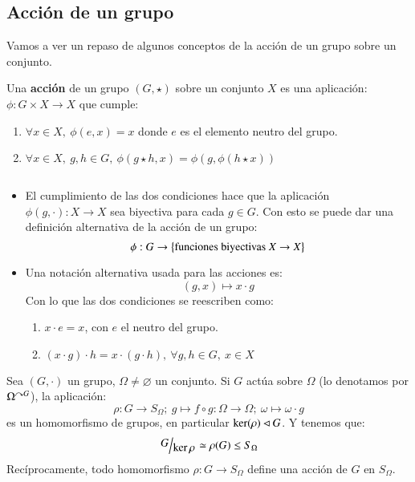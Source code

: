 \subsection{Acción de un grupo}

Vamos a ver un repaso de algunos conceptos de la acción de un grupo sobre un conjunto.

\begin{dfn}
    Una \textbf{acción} de un grupo $(G, \star)$ sobre un conjunto $X$ es una aplicación: $\phi: G \times X \to X$ que cumple:
    \begin{enumerate}
        \item $ \forall x \in X,\ \phi(e, x) = x$ donde $e$ es el elemento neutro del grupo.
        \item $ \forall x \in X,\ g, h \in G,\ \phi(g \star h, x) = \phi(g, \phi(h \star x))$
    \end{enumerate}
\end{dfn}
\begin{obs}$ $
    \begin{itemize}
        \item El cumplimiento de las dos condiciones hace que la aplicación $\phi(g, \cdot): X \to X$ sea biyectiva para cada $g \in G$. Con esto se puede dar una definición alternativa de la acción de un grupo:
        $$
            \phi: G \to \left\{\text{funciones biyectivas } X \to X\right\}
        $$
        \item Una notación alternativa usada para las acciones es:
        $$
            (g, x) \mapsto x \cdot g
        $$
        Con lo que las dos condiciones se reescriben como:
        \begin{enumerate}
            \item $x \cdot e = x$, con $e$ el neutro del grupo.
            \item $(x \cdot g) \cdot h = x \cdot (g \cdot h),\ \forall g,h \in G,\ x \in X$
        \end{enumerate}
    \end{itemize}
\end{obs}

\begin{pro}
    Sea $(G, \cdot)$ un grupo, $\Omega \neq \varnothing$ un conjunto. Si $G$ actúa sobre $\Omega$ (lo denotamos por $\Omega^{\curvearrowright G}$), la aplicación:
    $$
        \rho: G \to S_{\Omega};\ g \mapsto f \circ g: \Omega \to \Omega;\ \omega \mapsto \omega \cdot g
    $$
    es un homomorfismo de grupos, en particular $\ker(\rho) \lhd G$. Y tenemos que:
    $$
        \quo{G}{\ker \rho} \isom \rho(G) \leq S_{\Omega}
    $$
    Recíprocamente, todo homomorfismo $\rho: G \to S_\Omega $ define una acción de $G$ en $S_\Omega$.
\end{pro}

